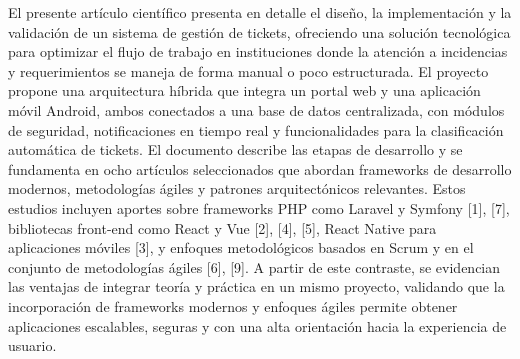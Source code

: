 El presente artículo científico presenta en detalle el diseño, la implementación y la 
validación de un sistema de gestión de tickets, ofreciendo una solución tecnológica para 
optimizar el flujo de trabajo en instituciones donde la atención a incidencias y 
requerimientos se maneja de forma manual o poco estructurada. El proyecto propone una 
arquitectura híbrida que integra un portal web y una aplicación móvil Android, ambos 
conectados a una base de datos centralizada, con módulos de seguridad, notificaciones en 
tiempo real y funcionalidades para la clasificación automática de tickets. El documento 
describe las etapas de desarrollo y se fundamenta en ocho artículos seleccionados que 
abordan frameworks de desarrollo modernos, metodologías ágiles y patrones 
arquitectónicos relevantes. Estos estudios incluyen aportes sobre frameworks PHP como 
Laravel y Symfony [1], [7], bibliotecas front-end como React y Vue [2], [4], [5], React 
Native para aplicaciones móviles [3], y enfoques metodológicos basados en Scrum y en 
el conjunto de metodologías ágiles [6], [9]. A partir de este contraste, se evidencian las 
ventajas de integrar teoría y práctica en un mismo proyecto, validando que la 
incorporación de frameworks modernos y enfoques ágiles permite obtener aplicaciones 
escalables, seguras y con una alta orientación hacia la experiencia de usuario.